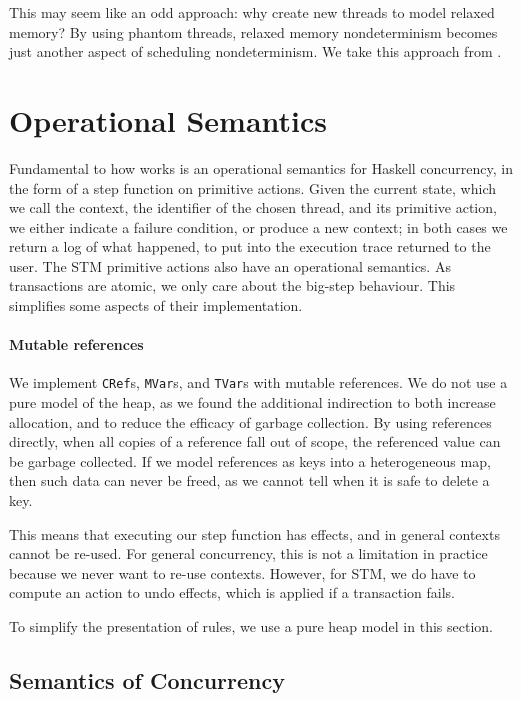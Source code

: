 This may seem like an odd approach: why create new threads to model
relaxed memory?  By using phantom threads, relaxed memory
nondeterminism becomes just another aspect of scheduling
nondeterminism.  We take this approach from \cite{zhang2015}.

\section{Operational Semantics}
\label{sec:dejafu-semantics}

Fundamental to how \dejafu{} works is an operational semantics for
Haskell concurrency, in the form of a step function on primitive
actions.  Given the current state, which we call the context, the
identifier of the chosen thread, and its primitive action, we either
indicate a failure condition, or produce a new context; in both cases
we return a log of what happened, to put into the execution trace
returned to the user.  The STM primitive actions also have an
operational semantics.  As transactions are atomic, we only care about
the big-step behaviour.  This simplifies some aspects of their
implementation.

\paragraph{Mutable references}
We implement \verb|CRef|s, \verb|MVar|s, and \verb|TVar|s with mutable
references.  We do not use a pure model of the heap, as we found the
additional indirection to both increase allocation, and to reduce the
efficacy of garbage collection.  By using references directly, when
all copies of a reference fall out of scope, the referenced value can
be garbage collected.  If we model references as keys into a
heterogeneous map, then such data can never be freed, as we cannot
tell when it is safe to delete a key.

This means that executing our step function has effects, and in
general contexts cannot be re-used.  For general concurrency, this is
not a limitation in practice because we never want to re-use contexts.
However, for STM, we do have to compute an action to undo effects,
which is applied if a transaction fails.

To simplify the presentation of rules, we use a pure heap model in
this section.

\subsection{Semantics of Concurrency}

